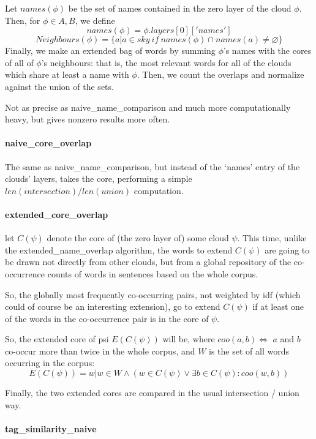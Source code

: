 \documentclass[11pt]{article}
\begin{document}
Let $names(\phi)$ be the set of names contained in the zero layer of the cloud $\phi$.
Then, for $\phi \in A,B$, we define
\[names(\phi) = \phi.layers[0]['names']\]
\[Neighbours(\phi) = \{a | a \in sky ~ if ~ names(\phi) \cap names(a) \neq \varnothing \}\]
Finally, we make an extended bag of words by summing $\phi$'s names with the cores of all of $\phi$'s neighbours: that is, the most relevant words for all of the clouds which share at least a name with $\phi$. Then, we count the overlaps and normalize against the union of the sets.

Not as precise as naive\_name\_comparison and much more computationally heavy, but gives nonzero results more often.

\paragraph{naive\_core\_overlap}

The same as naive\_name\_comparison, but instead of the `names' entry of the clouds' layers, takes the core, performing a simple \(len(intersection) / len(union)\) computation.

\paragraph{extended\_core\_overlap}

let $C(\psi)$ denote the core of (the zero layer of) some cloud $\psi$. This time, unlike the extended\_name\_overlap algorithm, the words to extend $C(\psi)$ are going to be drawn not directly from other clouds, but from a global repository of the co-occurrence counts of words in sentences based on the whole corpus.

So, the globally most frequently co-occurring pairs, not weighted by idf (which could of course be an interesting extension), go to extend $C(\psi)$ if at least one of the words in the co-occurrence pair is in the core of $\psi$.

So, the extended core of psi $E(C(\psi))$ will be, where $coo(a,b) \iff$ $a$ and $b$ co-occur more than twice in the whole corpus, and $W$ is the set of all words occurring in the corpus:
\[E(C(\psi)) = {w | w \in W \land (w \in C(\psi)\lor \exists b \in C(\psi) : coo(w,b)) }\]

Finally, the two extended cores are compared in the usual intersection / union way.


\paragraph{tag\_similarity\_naive}
\end{document}
